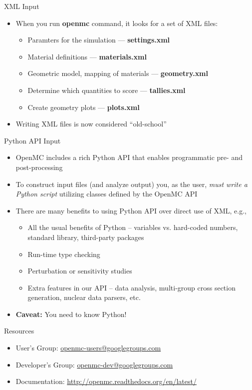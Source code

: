 \documentclass[noamssymb,svgnames]{beamer}
\begin{document}
\begin{frame}{XML Input}
  \begin{itemize}
  \item When you run \textbf{openmc} command, it looks for a set of XML files:
    \begin{itemize}
    \item Paramters for the simulation --- \textbf{settings.xml}
    \item Material definitions --- \textbf{materials.xml}
    \item Geometric model, mapping of materials --- \textbf{geometry.xml}
    \item Determine which quantities to score --- \textbf{tallies.xml}
    \item Create geometry plots --- \textbf{plots.xml}
    \end{itemize}
  \item Writing XML files is now considered ``old-school''
  \end{itemize}
\end{frame}

\begin{frame}{Python API Input}
  \begin{itemize}
  \item OpenMC includes a rich Python API that enables programmatic pre- and
    post-processing
  \item To construct input files (and analyze output) you, as the user,
    \emph{must write a Python script} utilizing classes defined by the OpenMC
    API
  \item There are many benefits to using Python API over direct use of XML,
    e.g.,
    \begin{itemize}
    \item All the usual benefits of Python -- variables vs. hard-coded numbers,
      standard library, third-party packages
    \item Run-time type checking
    \item Perturbation or sensitivity studies
    \item Extra features in our API -- data analysis, multi-group cross section
      generation, nuclear data parsers, etc.
    \end{itemize}
  \item \textbf{Caveat:} You need to know Python!
  \end{itemize}
\end{frame}

\begin{frame}{Resources}
  \begin{itemize}
  \item User's Group: \url{openmc-users@googlegroups.com}
  \item Developer's Group: \url{openmc-dev@googlegroups.com}
  \item Documentation: \url{http://openmc.readthedocs.org/en/latest/}
  \end{itemize}
\end{frame}
\end{document}
